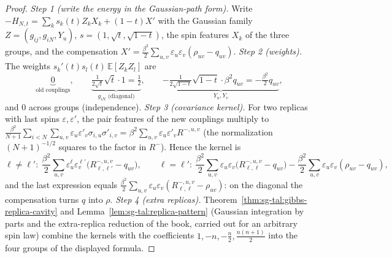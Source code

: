 \begin{proof}
\leanok
\emph{Step 1 (write the energy in the Gaussian-path form).} Write $-H_{N,t}=\sum_ks_k(t)Z_kX_k+(1-t)X'$ with the Gaussian family $Z=(g_{ij},g_{iN},Y_u)$, $s=(1,\sqrt t,\sqrt{1-t})$, the spin features $X_k$ of the three groups, and the compensation $X'=\frac{\beta^2}2\sum_{u,v}\varepsilon_u\varepsilon_v(\rho_{uv}-q_{uv})$.
\emph{Step 2 (weights).} The weights $s_k'(t)s_l(t)\,\mathbb E[Z_kZ_l]$ are
\[
\underbrace{0}_{\text{old couplings}},\qquad \underbrace{\tfrac1{2\sqrt t}\sqrt t\cdot1=\tfrac12}_{g_{iN}\text{ (diagonal)}},\qquad \underbrace{-\tfrac1{2\sqrt{1-t}}\sqrt{1-t}\cdot\beta^2q_{uv}=-\tfrac{\beta^2}2q_{uv}}_{Y_u,Y_v},
\]
and $0$ across groups (independence).
\emph{Step 3 (covariance kernel).} For two replicas with last spins $\varepsilon,\varepsilon'$, the pair features of the new couplings multiply to $\frac{\beta^2}{N+1}\sum_{i<N}\sum_{u,v}\varepsilon_u\varepsilon'_v\sigma_{i,u}\sigma'_{i,v}=\beta^2\sum_{u,v}\varepsilon_u\varepsilon'_vR^{-,u,v}$ (the normalization $(N+1)^{-1/2}$ squares to the factor in $R^-$). Hence the kernel is
\[
\ell\ne\ell':\ \frac{\beta^2}2\sum_{u,v}\varepsilon^\ell_u\varepsilon^{\ell'}_v\big(R^{-,u,v}_{\ell,\ell'}-q_{uv}\big),\qquad
\ell=\ell':\ \frac{\beta^2}2\sum_{u,v}\varepsilon_u\varepsilon_v\big(R^{-,u,v}_{\ell,\ell}-q_{uv}\big)-\frac{\beta^2}2\sum_{u,v}\varepsilon_u\varepsilon_v(\rho_{uv}-q_{uv}),
\]
and the last expression equals $\frac{\beta^2}2\sum_{u,v}\varepsilon_u\varepsilon_v(R^{-,u,v}_{\ell,\ell}-\rho_{uv})$: on the diagonal the compensation turns $q$ into $\rho$.
\emph{Step 4 (extra replicas).} Theorem~\ref{thm:sg-tal:gibbs-replica-cavity} and Lemma~\ref{lem:sg-tal:replica-pattern} (Gaussian integration by parts and the extra-replica reduction of the book, carried out for an arbitrary spin law) combine the kernels with the coefficients $1,-n,-\frac n2,\frac{n(n+1)}2$ into the four groups of the displayed formula.
\end{proof}

